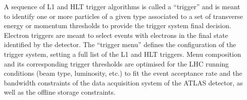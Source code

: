 A sequence of L1 and HLT trigger algorithms is called a ``trigger'' and is meant to identify one or more particles of a given type associated to a set of transverse energy or momentum thresholds to provide the trigger system final decision. Electron triggers are meant to select events with electrons in the final state identified by the detector. The ``trigger menu'' defines the configuration of the trigger system, setting a full list of the L1 and HLT triggers. Menu composition and its corresponding trigger thresholds are optimised for the LHC running conditions (beam type, luminosity, etc.) to fit the event acceptance rate and the bandwidth constraints of the data acquisition system of the ATLAS detector, as well as the offline storage constraints.
% 
% 
